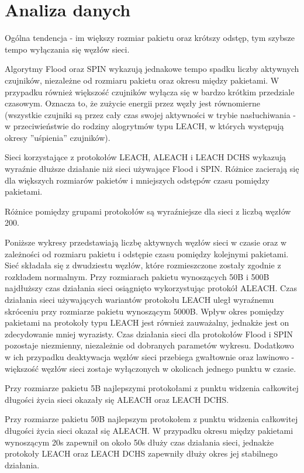 \section{Analiza danych}
Ogólna tendencja - im większy rozmiar pakietu oraz krótszy odstęp, tym  szybsze tempo wyłączania się węzłów sieci.

Algorytmy Flood oraz SPIN wykazują jednakowe tempo spadku liczby aktywnych czujników, niezależne od rozmiaru pakietu oraz okresu między pakietami. W przypadku również większość czujników wyłącza się w bardzo krótkim przedziale czasowym. Oznacza to, że zużycie energii przez węzły jest równomierne (wszystkie czujniki są przez cały czas swojej aktywności w trybie nasłuchiwania - w przeciwieństwie do rodziny alogrytmów typu LEACH, w których występują okresy ''uśpienia'' czujników).

Sieci korzystające z protokołów LEACH, ALEACH i LEACH DCHS wykazują wyraźnie dłuższe działanie niż sieci używające Flood i SPIN.
Różnice zacierają się dla większych rozmiarów pakietów i mniejszych odstępów czasu pomiędzy pakietami.

Różnice pomiędzy grupami protokołów są wyraźniejsze dla sieci z liczbą węzłów 200.

Poniższe wykresy przedstawiają liczbę aktywnych węzłów sieci w czasie oraz w zależności od rozmiaru pakietu i odstępie czasu pomiędzy kolejnymi pakietami. Sieć składała się z dwudziestu węzłów, które rozmieszczone zostały zgodnie z rozkładem normalnym.
Przy rozmiarach pakietu wynoszących 50B i 500B najdłuższy czas działania sieci osiągnięto wykorzystując protokół ALEACH. Czas działania sieci używających wariantów protokołu LEACH uległ wyraźnemu skróceniu przy rozmiarze pakietu wynoszącym 5000B. Wpływ okres pomiędzy pakietami na protokoły typu LEACH jest również zauważalny, jednakże jest on zdecydowanie mniej wyrazisty. Czas działania sieci dla protokołów Flood i SPIN pozostaje niezmienny, niezależnie od dobranych parametów wykresu. Dodatkowo w ich przypadku deaktywacja węzłów sieci przebiega gwałtownie oraz lawinowo - większość węzłów sieci zostaje wyłączonych w okolicach jednego punktu w czasie.

Przy rozmiarze pakietu 5B najlepszymi protokołami z punktu widzenia całkowitej długości życia sieci okazały się ALEACH oraz LEACH DCHS.

Przy rozmiarze pakietu 50B najlepszym protokołem z punktu widzenia całkowitej długości życia sieci okazał się ALEACH. W przypadku okresu między pakietami wynoszącym 20s zapewnił on około 50s dłuży czas działania sieci, jednakże protokoły LEACH oraz LEACH DCHS zapewniły dłuży okres jej stabilnego działania.

